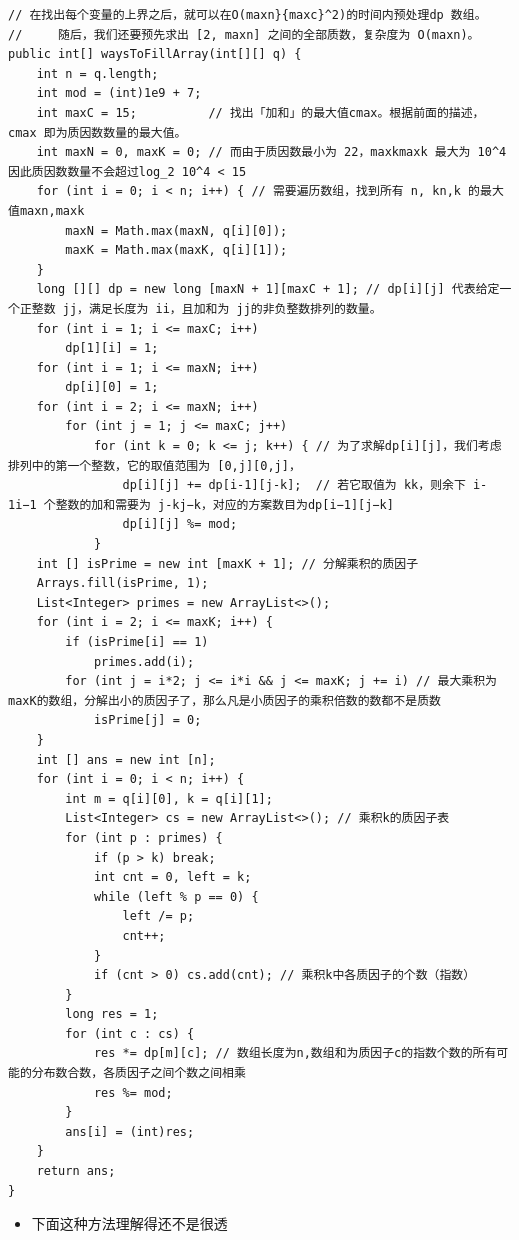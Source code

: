 \documentclass[9pt, b5paaper]{book}
\begin{document}
\begin{enumerate}
\begin{verbatim}
// 在找出每个变量的上界之后，就可以在O(maxn}{maxc}^2)的时间内预处理dp 数组。
//     随后，我们还要预先求出 [2, maxn] 之间的全部质数，复杂度为 O(maxn)。
public int[] waysToFillArray(int[][] q) {
    int n = q.length;
    int mod = (int)1e9 + 7;
    int maxC = 15;          // 找出「加和」的最大值cmax。根据前面的描述，cmax 即为质因数数量的最大值。
    int maxN = 0, maxK = 0; // 而由于质因数最小为 22，maxkmaxk 最大为 10^4因此质因数数量不会超过log_2 10^4 < 15
    for (int i = 0; i < n; i++) { // 需要遍历数组，找到所有 n, kn,k 的最大值maxn,maxk
        maxN = Math.max(maxN, q[i][0]);
        maxK = Math.max(maxK, q[i][1]);
    }
    long [][] dp = new long [maxN + 1][maxC + 1]; // dp[i][j] 代表给定一个正整数 jj，满足长度为 ii，且加和为 jj的非负整数排列的数量。
    for (int i = 1; i <= maxC; i++) 
        dp[1][i] = 1;
    for (int i = 1; i <= maxN; i++) 
        dp[i][0] = 1;
    for (int i = 2; i <= maxN; i++) 
        for (int j = 1; j <= maxC; j++) 
            for (int k = 0; k <= j; k++) { // 为了求解dp[i][j]，我们考虑排列中的第一个整数，它的取值范围为 [0,j][0,j]，
                dp[i][j] += dp[i-1][j-k];  // 若它取值为 kk，则余下 i-1i−1 个整数的加和需要为 j-kj−k，对应的方案数目为dp[i−1][j−k]
                dp[i][j] %= mod;
            }
    int [] isPrime = new int [maxK + 1]; // 分解乘积的质因子
    Arrays.fill(isPrime, 1);
    List<Integer> primes = new ArrayList<>();
    for (int i = 2; i <= maxK; i++) {
        if (isPrime[i] == 1) 
            primes.add(i);
        for (int j = i*2; j <= i*i && j <= maxK; j += i) // 最大乘积为maxK的数组，分解出小的质因子了，那么凡是小质因子的乘积倍数的数都不是质数
            isPrime[j] = 0;
    }
    int [] ans = new int [n];
    for (int i = 0; i < n; i++) {
        int m = q[i][0], k = q[i][1];
        List<Integer> cs = new ArrayList<>(); // 乘积k的质因子表
        for (int p : primes) {
            if (p > k) break;
            int cnt = 0, left = k;
            while (left % p == 0) {
                left /= p;
                cnt++;
            }
            if (cnt > 0) cs.add(cnt); // 乘积k中各质因子的个数（指数）
        }
        long res = 1;
        for (int c : cs) {
            res *= dp[m][c]; // 数组长度为n,数组和为质因子c的指数个数的所有可能的分布数合数，各质因子之间个数之间相乘
            res %= mod;
        }
        ans[i] = (int)res;
    }
    return ans;
}
\end{verbatim}
\begin{itemize}
\item 下面这种方法理解得还不是很透

\end{itemize}
\end{enumerate}
\end{document}
